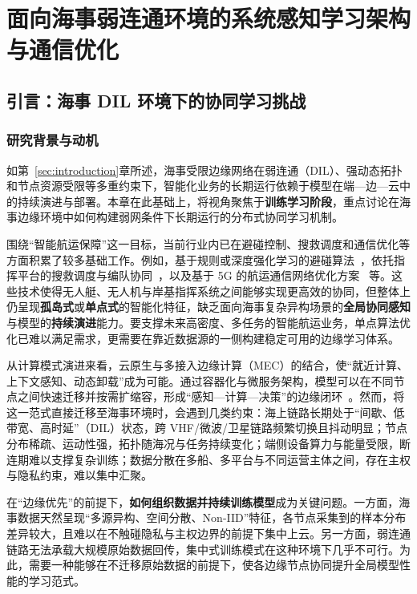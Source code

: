 
\section{面向海事弱连通环境的系统感知学习架构与通信优化}
\subsection{引言：海事 DIL 环境下的协同学习挑战}
\label{sec:introduction_2.1}
\subsubsection{研究背景与动机}
如第~\ref{sec:introduction}章所述，海事受限边缘网络在弱连通（DIL）、强动态拓扑和节点资源受限等多重约束下，智能化业务的长期运行依赖于模型在端—边—云中的持续演进与部署。本章在此基础上，将视角聚焦于\textbf{训练学习阶段}，重点讨论在海事边缘环境中如何构建弱网条件下长期运行的分布式协同学习机制。

围绕“智能航运保障”这一目标，当前行业内已在避碰控制、搜救调度和通信优化等方面积累了较多基础工作。例如，基于规则或深度强化学习的避碰算法~，依托指挥平台的搜救调度与编队协同~，以及基于 5G 的航运通信网络优化方案~ 等。这些技术使得无人艇、无人机与岸基指挥系统之间能够实现更高效的协同，但整体上仍呈现\textbf{孤岛式}或\textbf{单点式}的智能化特征，缺乏面向海事复杂异构场景的\textbf{全局协同感知}与模型的\textbf{持续演进}能力。要支撑未来高密度、多任务的智能航运业务，单点算法优化已难以满足需求，更需要在靠近数据源的一侧构建稳定可用的边缘学习体系。

从计算模式演进来看，云原生与多接入边缘计算（MEC）的结合，使“就近计算、上下文感知、动态卸载”成为可能。通过容器化与微服务架构，模型可以在不同节点之间快速迁移并按需扩缩容，形成“感知—计算—决策”的边缘闭环~。然而，将这一范式直接迁移至海事环境时，会遇到几类约束：海上链路长期处于“间歇、低带宽、高时延”（DIL）状态，跨 VHF/微波/卫星链路频繁切换且抖动明显；节点分布稀疏、运动性强，拓扑随海况与任务持续变化；端侧设备算力与能量受限，断连期难以支撑复杂训练；数据分散在多船、多平台与不同运营主体之间，存在主权与隐私约束，难以集中汇聚。

在“边缘优先”的前提下，\textbf{如何组织数据并持续训练模型}成为关键问题。一方面，海事数据天然呈现“多源异构、空间分散、Non-IID”特征，各节点采集到的样本分布差异较大，且难以在不触碰隐私与主权边界的前提下集中上云。另一方面，弱连通链路无法承载大规模原始数据回传，集中式训练模式在这种环境下几乎不可行。为此，需要一种能够在不迁移原始数据的前提下，使各边缘节点协同提升全局模型性能的学习范式。

